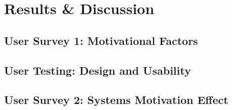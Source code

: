 
\chapter{Results \& Discussion}

\section{User Survey 1: Motivational Factors}

\section{User Testing: Design and Usability}

\section{User Survey 2: Systems Motivation Effect}


\cleardoublepage